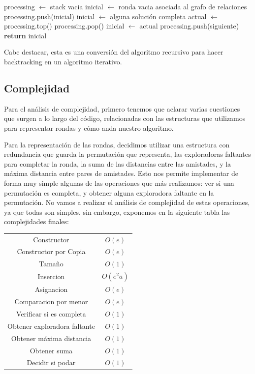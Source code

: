 \documentclass{article}
\theoremstyle{definition}
\theoremstyle{remark}
\begin{document}
\begin{algorithmic}[1]
\State processing $\gets$ stack vacia 
\State inicial $\gets$ ronda vacia asociada al grafo de relaciones 
\State processing.push(inicial) 
\State inicial $\gets$ alguna solución completa 
 
\State actual $\gets$ processing.top() 
\State processing.pop() 
 
 
\State inicial $\gets$ actual 
\EndIf
\Else
{} 
 
\State processing.push(siguiente) 
\EndIf
\EndFor
\EndIf
\EndWhile
\State \textbf{return} inicial
\EndProcedure
\end{algorithmic}

Cabe destacar, esta es una conversión del algoritmo recursivo para hacer backtracking en un algoritmo iterativo.

\subsection{Complejidad}

Para el análisis de complejidad, primero tenemos que aclarar varias cuestiones que surgen a lo largo del código, relacionadas con las estructuras que utilizamos para representar rondas y cómo anda nuestro algoritmo.

Para la representación de las rondas, decidimos utilizar una estructura con redundancia que guarda la permutación que representa, las exploradoras faltantes para completar la ronda, la suma de las distancias entre las amistades, y la máxima distancia entre pares de amistades. Esto nos permite implementar de forma muy simple algunas de las operaciones que más realizamos: ver si una permutación es completa, y obtener alguna exploradora faltante en la permutación. No vamos a realizar el análisis de complejidad de estas operaciones, ya que todas son simples, sin embargo, exponemos en la siguiente tabla las complejidades finales:


\begin{tabular}{c|c}
 Constructor & $O(e)$ \\
 Constructor por Copia & $O(e)$ \\
 Tamaño & $O(1)$ \\
 Insercion & $O(e^2 a)$ \\
 Asignacion & $O(e)$ \\
 Comparacion por menor & $O(e)$ \\
 Verificar si es completa & $O(1)$ \\
 Obtener exploradora faltante & $O(1)$ \\
 Obtener máxima distancia & $O(1)$ \\
 Obtener suma & $O(1)$ \\
 Decidir si podar & $O(1)$ \\
\end{tabular}
\end{document}
